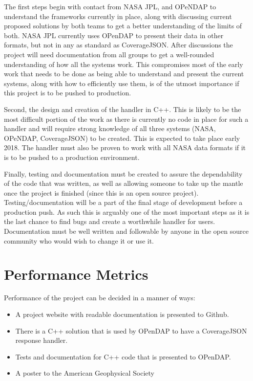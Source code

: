 \documentclass[letterpaper,10pt,draftclsnofoot,onecolumn]{IEEEtran}
\begin{document}
\indent The first steps begin with contact from NASA JPL, and OPeNDAP to understand the frameworks currently in place, along with discussing current proposed solutions by both teams to get a better understanding of the limits of both. NASA JPL currently uses OPenDAP to present their data in other formats, but not in any as standard as CoverageJSON. After discussions the project will need documentation from all groups to get a well-rounded understanding of how all the systems work. This compromises most of the early work that needs to be done as being able to understand and present the current systems, along with how to efficiently use them, is of the utmost importance if this project is to be pushed to production. \par
Second, the design and creation of the handler in C++. This is likely to be the most difficult portion of the work as there is currently no code in place for such a handler and will require strong knowledge of all three systems (NASA, OPeNDAP, CoverageJSON) to be created. This is expected to take place early 2018. The handler must also be proven to work with all NASA data formats if it is to be pushed to a production environment. \par
Finally, testing and documentation must be created to assure the dependability of the code that was written, as well as allowing someone to take up the mantle once the project is finished (since this is an open source project). Testing/documentation will be a part of the final stage of development before a production push. As such this is arguably one of the most important steps as it is the last chance to find bugs and create a worthwhile handler for users. Documentation must be well written and followable by anyone in the open source community who would wish to change it or use it. 
\newpage

\section{Performance Metrics}
Performance of the project can be decided in a manner of ways:
\begin{itemize}
  \item A project website with readable documentation is presented to Github. 
  \item There is a C++ solution that is used by OPenDAP to have a CoverageJSON response handler.
  \item Tests and documentation for C++ code that is presented to OPenDAP.
  \item A poster to the American Geophysical Society
\end{itemize}
\end{document}
